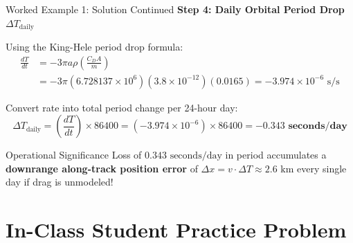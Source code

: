 \documentclass[aspectratio=169,11pt]{beamer}
\begin{document}
\begin{frame}{Worked Example 1: Solution Continued}
    \textbf{Step 4: Daily Orbital Period Drop $\Delta T_{\text{daily}}$}
    \par\smallskip
    Using the King-Hele period drop formula:
    \begin{align*}
        \frac{dT}{dt} &= -3\pi a \rho \left(\frac{C_D A}{m}\right) \\
        &= -3\pi (6.728137 \times 10^6) (3.8 \times 10^{-12}) (0.0165) = -3.974 \times 10^{-6}\text{ s/s}
    \end{align*}

    Convert rate into total period change per 24-hour day:
    \begin{equation*}
        \Delta T_{\text{daily}} = \left( \frac{dT}{dt} \right) \times 86400 = (-3.974 \times 10^{-6}) \times 86400 = \mathbf{-0.343\text{ seconds/day}}
    \end{equation*}

    \begin{block}{Operational Significance}
        Loss of $0.343\text{ seconds/day}$ in period accumulates a \textbf{downrange along-track position error} of $\Delta x = v \cdot \Delta T \approx 2.6\text{ km}$ every single day if drag is unmodeled!
    \end{block}
\end{frame}

\section{In-Class Student Practice Problem}
\end{document}
